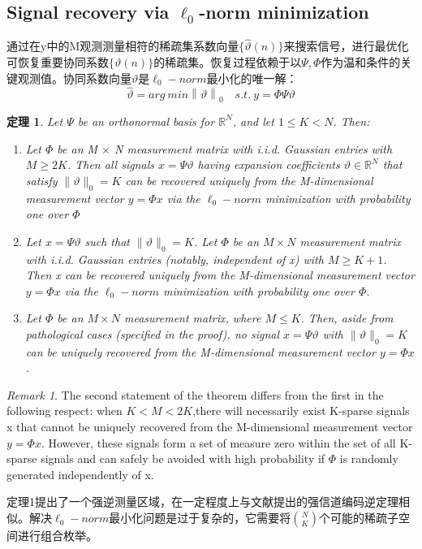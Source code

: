 \documentclass[UTF8]{ctexart}
\theoremstyle{plain}
\newtheorem{theorem}{定理}[section]
\theoremstyle{definition}
\theoremstyle{remark}
\newtheorem{remark}{Remark}
\newcommand{\upcite}[1]{\textsuperscript{\textsuperscript{\cite{#1}}}}
\begin{document}
\subsection{Signal recovery via $\ell_0$-norm minimization}
通过在y中的M观测测量相符的稀疏集系数向量$\{ \widehat{\vartheta}(n) \}$来搜索信号，进行最优化可恢复重要协同系数$\{ \vartheta(n) \}$的稀疏集。恢复过程依赖于以$\Psi,\Phi$作为温和条件的关键观测值。协同系数向量$\vartheta$是$\ell_0-norm$最小化的唯一解：
\begin{equation}
	\widehat{\vartheta}=arg \  min\left \| \vartheta \right \|_0 \quad s.t.\  y=\Phi\Psi\vartheta
	\label{eq2}
\end{equation}

\begin{theorem}
	\label{th1}
	Let $\Psi$ be an orthonormal basis for $\mathbb{R}^N$, and let $1 \leq K < N$. Then:
	\begin{enumerate}
		\item Let $\Phi$ be an M $\times$ N measurement matrix with i.i.d. Gaussian entries with $M \geq 2K$. Then all signals $x = \Psi \vartheta$ having expansion coefficients $\vartheta \in \mathbb{R}^N$ that satisfy $\lVert \vartheta \rVert_0 = K$ can be recovered uniquely from the M-dimensional measurement vector $y=\Phi x$ via the $\ell_0-norm$ minimization  with probability one over $\Phi$
		
		\item Let $x = \Psi \vartheta$ such that $\lVert\vartheta\rVert_0 = K$. Let $\Phi$ be an $M \times N$ measurement matrix with i.i.d. Gaussian entries (notably, independent of x) with $M \geq K + 1$. Then x can be recovered uniquely from the M-dimensional measurement vector $y = \Phi x$ via the $\ell_0-norm$ minimization  with probability one over $\Phi$.
		
		\item Let $\Phi$ be an $M \times N$ measurement matrix, where $M \leq K$. Then, aside from pathological cases (specified in the proof), no signal $x = \Psi\vartheta$ with $\lVert\vartheta\rVert_0 = K$ can be uniquely recovered from the M-dimensional measurement vector $y = \Phi x$.
	\end{enumerate}	
\end{theorem}

\begin{remark}
	\label{rm1}
	The second statement of the theorem differs from the first in the following respect: when $K < M < 2K$,there will necessarily exist K-sparse signals x that cannot be uniquely recovered from the M-dimensional measurement vector $y = \Phi x$. However, these signals form a set of measure zero within the set of all K-sparse signals and can safely be avoided with high probability if $\Phi$ is randomly generated independently of x.
\end{remark}
定理1提出了一个强逆测量区域，在一定程度上与文献\upcite{2}提出的强信道编码逆定理相似。解决$\ell_0-norm$最小化问题是过于复杂的，它需要将${N \choose K}$个可能的稀疏子空间进行组合枚举。
\end{document}
